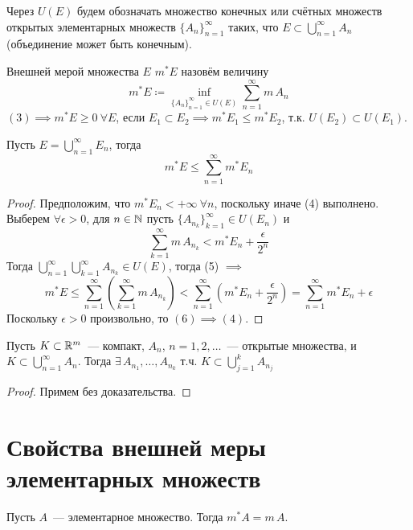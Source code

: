 \documentclass[main]{subfiles}
\begin{document}
\begin{definition}
    Через $U(E)$ будем обозначать множество конечных или счётных множеств открытых элементарных множеств $\{A_n\}^\infty_{n=1}$ таких, что $E\subset\bigcup_{n=1}^{\infty} A_n$ (объединение может быть конечным).
\end{definition}

\begin{definition}
    Внешней мерой множества $E$ $m^*E$ назовём величину
    \[ m^*E \coloneq \inf_{\{A_n\}^\infty_{n=1}\in U(E)} \sum_{n=1}^{\infty} m\,A_n\tag{3} \]
    $(3) \implies m^*E\ge 0\ \forall E$, если $E_1\subset E_2\implies m^*E_1\le m^*E_2$, т.к. $U(E_2)\subset U(E_1)$.
\end{definition}

\begin{theorem}
    Пусть $E=\bigcup_{n=1}^{\infty} E_n$, тогда \[m^*E\le\sum_{n=1}^{\infty} m^*E_n\tag{4}\]
\end{theorem}

\begin{proof}
    Предположим, что $m^*E_n<+\infty\ \forall n$, поскольку иначе (4) выполнено.
    Выберем $\forall\epsilon>0$, для $n\in\mathbb{N}$ пусть $\{A_{n_k}\}^\infty_{k=1}\in U(E_n)$ и
    \[ \sum_{k=1}^{\infty} m\,A_{n_k}< m^*E_n+\frac{\epsilon}{2^n}\tag{5} \]
    Тогда $\bigcup_{n=1}^{\infty} \bigcup_{k=1}^\infty A_{n_k}\in U(E)$, тогда (5) $\implies$
    \[ m^*E\le\sum_{n=1}^{\infty} \left( \sum_{k=1}^{\infty} m\,A_{n_k} \right) < \sum_{n=1}^{\infty} \left(m^*E_n+\frac{\epsilon}{2^n}\right) = \sum_{n=1}^{\infty} m^*E_n+\epsilon\tag{6} \]
    Поскольку $\epsilon>0$ произвольно, то $(6)\implies (4)$.
\end{proof}

\begin{lemma}[Бореля]
    Пусть $K\subset\mathbb{R}^m$~--- компакт, $A_n$, $n=1, 2, \dots$~--- открытые множества, и $K\subset\bigcup_{n=1}^{\infty} A_n$.
    Тогда $\exists\,A_{n_1}, \dots,A_{n_k}$ т.ч. $K\subset \bigcup_{j=1}^k A_{n_j}$
\end{lemma}

\begin{proof}
    Примем без доказательства.
\end{proof}

\section{Свойства внешней меры элементарных множеств}
\begin{theorem}
    Пусть $A$~--- элементарное множество.
    Тогда $m^*A=m\,A$.
\end{theorem}
\end{document}
